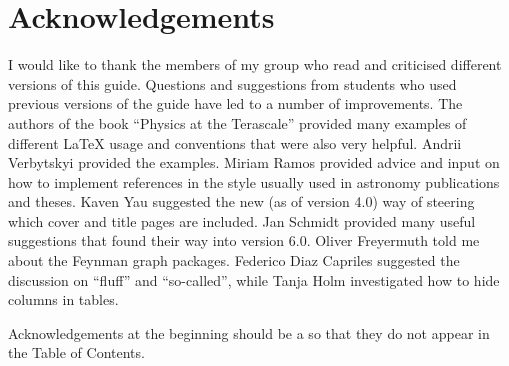 \chapter*{Acknowledgements}%
\label{sec:ack1}

I would like to thank the members of my group who read and criticised
different versions of this guide. Questions and suggestions from
students who used previous versions of the guide have led to a number
of improvements. The authors of the book \enquote{Physics at the
Terascale} provided many examples of different \LaTeX{} usage and
conventions that were also very helpful.
Andrii Verbytskyi provided the \TikZ examples.
Miriam Ramos provided advice and input on how to implement references 
in the style usually used in astronomy publications and theses.
Kaven Yau suggested the new (as of version 4.0) way of steering which cover
and title pages are included.
Jan Schmidt provided many useful suggestions that found their way into version 6.0.
Oliver Freyermuth told me about the \TikZ Feynman graph packages.
Federico Diaz Capriles suggested the discussion on \enquote{fluff} and \enquote{so-called},
while Tanja Holm investigated how to hide columns in tables.

Acknowledgements at the beginning should be a  so that they
do not appear in the Table of Contents.
